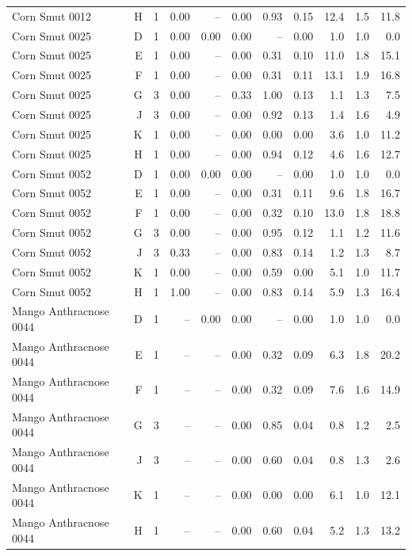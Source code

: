 \begin{table}[H]
{\begin{tabular}{lrrrrrrrrrr}
Corn Smut 0012 & H & 1 & 0.00 & -- & 0.00 & 0.93 & 0.15 & 12.4 & 1.5 & 11.8 \\
Corn Smut 0025 & D & 1 & 0.00 & 0.00 & 0.00 & -- & 0.00 & 1.0 & 1.0 & 0.0 \\
Corn Smut 0025 & E & 1 & 0.00 & -- & 0.00 & 0.31 & 0.10 & 11.0 & 1.8 & 15.1 \\
Corn Smut 0025 & F & 1 & 0.00 & -- & 0.00 & 0.31 & 0.11 & 13.1 & 1.9 & 16.8 \\
Corn Smut 0025 & G & 3 & 0.00 & -- & 0.33 & 1.00 & 0.13 & 1.1 & 1.3 & 7.5 \\
Corn Smut 0025 & J & 3 & 0.00 & -- & 0.00 & 0.92 & 0.13 & 1.4 & 1.6 & 4.9 \\
Corn Smut 0025 & K & 1 & 0.00 & -- & 0.00 & 0.00 & 0.00 & 3.6 & 1.0 & 11.2 \\
Corn Smut 0025 & H & 1 & 0.00 & -- & 0.00 & 0.94 & 0.12 & 4.6 & 1.6 & 12.7 \\
Corn Smut 0052 & D & 1 & 0.00 & 0.00 & 0.00 & -- & 0.00 & 1.0 & 1.0 & 0.0 \\
Corn Smut 0052 & E & 1 & 0.00 & -- & 0.00 & 0.31 & 0.11 & 9.6 & 1.8 & 16.7 \\
Corn Smut 0052 & F & 1 & 0.00 & -- & 0.00 & 0.32 & 0.10 & 13.0 & 1.8 & 18.8 \\
Corn Smut 0052 & G & 3 & 0.00 & -- & 0.00 & 0.95 & 0.12 & 1.1 & 1.2 & 11.6 \\
Corn Smut 0052 & J & 3 & 0.33 & -- & 0.00 & 0.83 & 0.14 & 1.2 & 1.3 & 8.7 \\
Corn Smut 0052 & K & 1 & 0.00 & -- & 0.00 & 0.59 & 0.00 & 5.1 & 1.0 & 11.7 \\
Corn Smut 0052 & H & 1 & 1.00 & -- & 0.00 & 0.83 & 0.14 & 5.9 & 1.3 & 16.4 \\
Mango Anthracnose 0044 & D & 1 & -- & 0.00 & 0.00 & -- & 0.00 & 1.0 & 1.0 & 0.0 \\
Mango Anthracnose 0044 & E & 1 & -- & -- & 0.00 & 0.32 & 0.09 & 6.3 & 1.8 & 20.2 \\
Mango Anthracnose 0044 & F & 1 & -- & -- & 0.00 & 0.32 & 0.09 & 7.6 & 1.6 & 14.9 \\
Mango Anthracnose 0044 & G & 3 & -- & -- & 0.00 & 0.85 & 0.04 & 0.8 & 1.2 & 2.5 \\
Mango Anthracnose 0044 & J & 3 & -- & -- & 0.00 & 0.60 & 0.04 & 0.8 & 1.3 & 2.6 \\
Mango Anthracnose 0044 & K & 1 & -- & -- & 0.00 & 0.00 & 0.00 & 6.1 & 1.0 & 12.1 \\
Mango Anthracnose 0044 & H & 1 & -- & -- & 0.00 & 0.60 & 0.04 & 5.2 & 1.3 & 13.2 \\

\end{tabular}}
\end{table}
